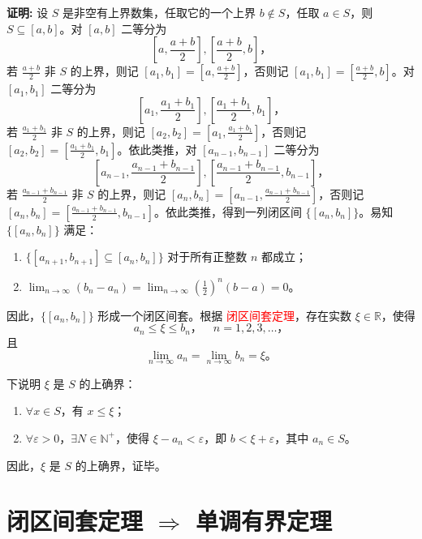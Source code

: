 \documentclass[lang=cn,newtx,10pt,scheme=chinese]{elegantbook}
\begin{document}
\textbf{证明:} 设 $S$ 是非空有上界数集，任取它的一个上界 $b \notin S$，任取 $a \in S$，则 $S \subseteq [a, b]$。对 $[a, b]$ 二等分为
\[
\left[ a, \frac{a + b}{2} \right], \left[ \frac{a + b}{2}, b \right]，
\]
若 $\frac{a + b}{2}$ 非 $S$ 的上界，则记 $[a_1, b_1] = \left[ a, \frac{a + b}{2} \right]$，否则记 $[a_1, b_1] = \left[ \frac{a + b}{2}, b \right]$。对 $[a_1, b_1]$ 二等分为
\[
\left[ a_1, \frac{a_1 + b_1}{2} \right], \left[ \frac{a_1 + b_1}{2}, b_1 \right]，
\]
若 $\frac{a_1 + b_1}{2}$ 非 $S$ 的上界，则记 $[a_2, b_2] = \left[ a_1, \frac{a_1 + b_1}{2} \right]$，否则记 $[a_2, b_2] = \left[ \frac{a_1 + b_1}{2}, b_1 \right]$。依此类推，对 $[a_{n-1}, b_{n-1}]$ 二等分为
\[
\left[ a_{n-1}, \frac{a_{n-1} + b_{n-1}}{2} \right], \left[ \frac{a_{n-1} + b_{n-1}}{2}, b_{n-1} \right]，
\]
若 $\frac{a_{n-1} + b_{n-1}}{2}$ 非 $S$ 的上界，则记 $[a_n, b_n] = \left[ a_{n-1}, \frac{a_{n-1} + b_{n-1}}{2} \right]$，否则记 $[a_n, b_n] = \left[ \frac{a_{n-1} + b_{n-1}}{2}, b_{n-1} \right]$。依此类推，得到一列闭区间 $\{[a_n, b_n]\}$。易知 $\{[a_n, b_n]\}$ 满足：
\begin{enumerate}
    \item $\{[a_{n+1}, b_{n+1}] \subseteq [a_n, b_n]\}$ 对于所有正整数 $n$ 都成立；
    \item $\lim_{n \to \infty} (b_n - a_n) = \lim_{n \to \infty} \left(\frac{1}{2}\right)^n (b - a) = 0$。
\end{enumerate}

因此，$\{[a_n, b_n]\}$ 形成一个闭区间套。根据 \textcolor{red}{闭区间套定理}，存在实数 $\xi \in \mathbb{R}$，使得
\[
a_n \leq \xi \leq b_n，\quad n = 1, 2, 3, \ldots，
\]
且
\[
\lim_{n \to \infty} a_n = \lim_{n \to \infty} b_n = \xi。
\]

下说明 $\xi$ 是 $S$ 的上确界：
\begin{enumerate}
    \item $\forall x \in S$，有 $x \leq \xi$；
    \item $\forall \varepsilon > 0$，$\exists N \in \mathbb{N}^+$，使得 $\xi - a_n < \varepsilon$，即 $b < \xi + \varepsilon$，其中 $a_n \in S$。
\end{enumerate}

因此，$\xi$ 是 $S$ 的上确界，证毕。


\section*{闭区间套定理 $\Rightarrow$ 单调有界定理}
\end{document}
